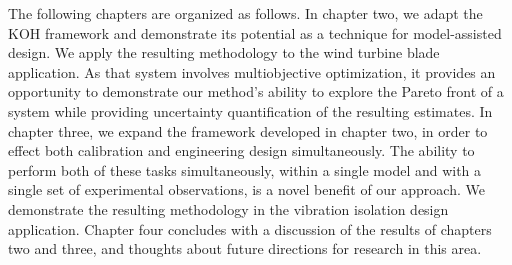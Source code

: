 \documentclass[12pt]{article}
\begin{document}
The following chapters are organized as follows.
In chapter two, we adapt the KOH framework and demonstrate its potential as a technique for model-assisted design.
We apply the resulting methodology to the wind turbine blade application.
As that system involves multiobjective optimization, it provides an opportunity to demonstrate our method's ability to explore the Pareto front of a system while providing uncertainty quantification of the resulting estimates.
In chapter three, we expand the framework developed in chapter two, in order to effect both calibration and engineering design simultaneously.
The ability to perform both of these tasks simultaneously, within a single model and with a single set of experimental observations, is a novel benefit of our approach.
We demonstrate the resulting methodology in the vibration isolation design application.
Chapter four concludes with a discussion of the results of chapters two and three, and thoughts about future directions for research in this area.




	
\end{document}

